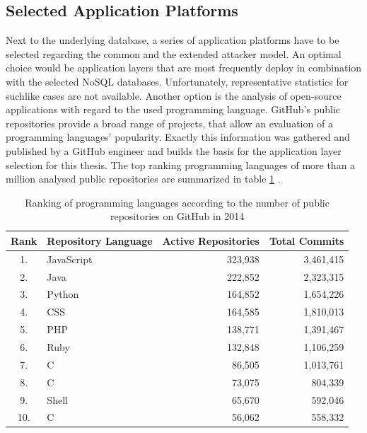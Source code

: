 \subsection{Selected Application Platforms}
Next to the underlying database, a series of application platforms have to be selected regarding the common and the extended attacker model. An optimal choice would be application layers that are most frequently deploy in combination with the selected NoSQL databases. Unfortunately, representative statistics for suchlike cases are not available. Another option is the analysis of open-source applications with regard to the used programming language. GitHub's public repositories provide a broad range of projects, that allow an evaluation of a programming languages' popularity. Exactly this information was gathered and published by a GitHub engineer and builds the basis for the application layer selection for this thesis. The top ranking programming languages of more than a million analysed public repositories are summarized in table \ref{tab:language_ranking} \cite{Zapponi2014}.

\begin{table}[h]
 \sffamily 
 \centering
 \begin{tabular}{clrr}
  \textbf{Rank} & \textbf{Repository Language} & \textbf{Active Repositories} & \textbf{Total Commits} \\ \hline
  \rowcolor{light-gray} 1. &  JavaScript     & 323,938 & 3,461,415 \\
  2. &  Java   & 222,852 & 2,323,315 \\
  \rowcolor{light-gray} 3. &  Python  & 164,852 & 1,654,226 \\
  4. &  CSS       & 164,585 & 1,810,013 \\
  \rowcolor{light-gray}5. &  PHP      & 138,771 & 1,391,467 \\
  \rowcolor{light-gray}6. &  Ruby  & 132,848 & 1,106,259 \\
   7. &  C\scriptsize\raisebox{.5ex}{++} & 86,505 & 1,013,761 \\
  8. &  C & 73,075 & 804,339 \\
  9. &  Shell   & 65,670 & 592,046 \\
  10. &  C\scriptsize\raisebox{.5ex}{\#} & 56,062 & 558,332 \\
  \bottomrule
 \end{tabular}
 \caption{Ranking of programming languages according to the number of public repositories on GitHub in 2014}
 \label{tab:language_ranking}
\end{table}

